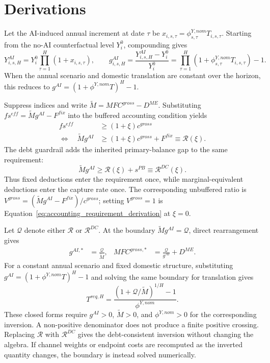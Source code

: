 \section{Derivations}\label{app:derivations}

Let the AI-induced annual increment at date $\tau$ be
$x_{i,s,\tau}=\phi^{Y,nom}_{s,\tau}T_{i,s,\tau}$. Starting from the no-AI
counterfactual level $Y_i^0$, compounding gives
\begin{equation}
  Y^{AI}_{i,s,H}
  =Y_i^0\prod_{\tau=1}^{H}(1+x_{i,s,\tau}),
  \qquad
  g^{AI}_{i,s,H}
  =\frac{Y^{AI}_{i,s,H}-Y_i^0}{Y_i^0}
  =\prod_{\tau=1}^{H}
    \left(1+\phi^{Y,nom}_{s,\tau}T_{i,s,\tau}\right)-1.
  \label{eq:accumulated_gain_derivation}
\end{equation}
When the annual scenario and domestic translation are constant over the
horizon, this reduces to
$g^{AI}=(1+\phi^{Y,nom}T)^H-1$.

Suppress indices and write
$\widetilde M=MFC^{gross}-D^{ME}$. Substituting
$fs^{eff}=\widetilde M g^{AI}-F^{fix}$ into the buffered accounting
condition yields
\begin{align}
  fs^{eff}&\geq(1+\xi)c^{gross}
  \nonumber\\
  \Longleftrightarrow\quad
  \widetilde M g^{AI}
    &\geq(1+\xi)c^{gross}+F^{fix}
     \equiv\mathcal R(\xi).
  \label{eq:accounting_requirement_derivation}
\end{align}
The debt guardrail adds the inherited primary-balance gap to the same
requirement:
\begin{equation}
  \widetilde M g^{AI}
  \geq \mathcal R(\xi)+s^{PB}
  \equiv \mathcal R^{DC}(\xi).
  \label{eq:debt_requirement_derivation}
\end{equation}
Thus fixed deductions enter the requirement once, while marginal-equivalent
deductions enter the capture rate once. The corresponding unbuffered ratio is
$V^{gross}=(\widetilde M g^{AI}-F^{fix})/c^{gross}$; setting $V^{gross}=1$
is Equation~\eqref{eq:accounting_requirement_derivation} at $\xi=0$.

Let $\mathcal Q$ denote either $\mathcal R$ or $\mathcal R^{DC}$. At the
boundary $\widetilde M g^{AI}=\mathcal Q$, direct rearrangement gives
\begin{align}
  g^{AI,*}
    &=\frac{\mathcal Q}{\widetilde M},
  &
  MFC^{gross,*}
    &=\frac{\mathcal Q}{g^{AI}}+D^{ME}.
  \label{eq:gain_capture_derivation}
\end{align}
For a constant annual scenario and fixed domestic structure, substituting
$g^{AI}=(1+\phi^{Y,nom}T)^H-1$ and solving the same boundary for translation
gives
\begin{equation}
  T^{req,H}
  =\frac{\left(1+\mathcal Q/\widetilde M\right)^{1/H}-1}
          {\phi^{Y,nom}}.
  \label{eq:translation_requirement_derivation}
\end{equation}
These closed forms require $g^{AI}>0$, $\widetilde M>0$, and
$\phi^{Y,nom}>0$ for the corresponding inversion. A non-positive denominator
does not produce a finite positive crossing. Replacing $\mathcal R$ with
$\mathcal R^{DC}$ gives the debt-consistent inversion without changing the
algebra. If channel weights or endpoint costs are recomputed as the inverted
quantity changes, the boundary is instead solved numerically.
